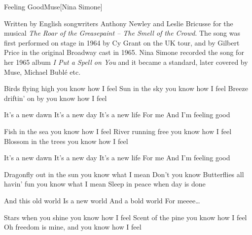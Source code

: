 \documentclass[a4paper,11pt,french]{article}
\begin{document}
\begin{Song}{Feeling Good}{Muse}[Nina Simone]

\begin{Paratext}
Written by English songwriters Anthony Newley and Leslie Bricusse for the musical \emph{The Roar of the Greasepaint – The Smell of the Crowd}. The song was first performed on stage in 1964 by Cy Grant on the UK tour, and by Gilbert Price in the original Broadway cast in 1965. Nina Simone recorded the song for her 1965 album \emph{I Put a Spell on You} and it became a standard, later covered by Muse, Michael Bublé etc.
\end{Paratext}

\begin{multicols}{2}

\begin{Verse}
Birds flying high you know how I feel
Sun in the sky you know how I feel
Breeze driftin' on by you know how I feel
\end{Verse}
\espaceInterStrophe

\begin{Chorus}
It's a new dawn
It's a new day
It's a new life
For me
And I'm feeling good
\end{Chorus}
\espaceInterStrophe

\begin{Verse}
Fish in the sea you know how I feel
River running free you know how I feel
Blossom in the trees you know how I feel
\end{Verse}
\espaceInterStrophe

\begin{Chorus}
It's a new dawn
It's a new day
It's a new life
For me
And I'm feeling good
\end{Chorus}
\vfill
\columnbreak

\begin{Verse}
Dragonfly out in the sun you know what I mean
Don't you know
Butterflies all havin' fun you know what I mean
Sleep in peace when day is done
\end{Verse}
\espaceInterStrophe

\begin{Chorus}
And this old world 
Is a new world
And a bold world
For meeee\dots
\end{Chorus}
\espaceInterStrophe

\begin{Verse}
Stars when you shine you know how I feel
Scent of the pine you know how I feel
Oh freedom is mine, and you know how I feel
\end{Verse}
\espaceInterStrophe


\end{multicols}
\end{Song}
\end{document}
